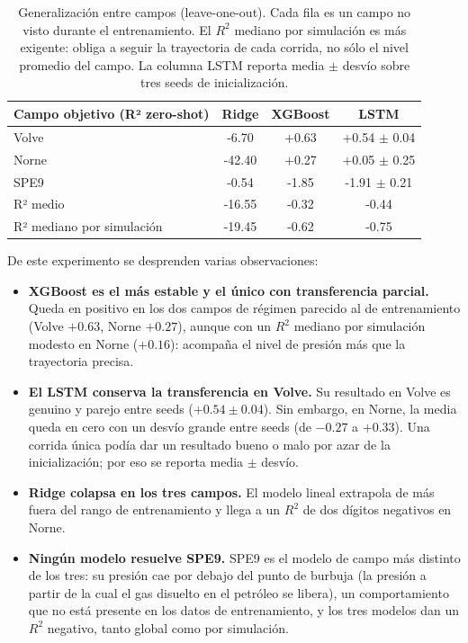 \documentclass[12pt,a4paper]{article}
\begin{document}
\begin{table}[H]
\centering
\begin{tabular}{|l|c|c|c|}
\hline
\textbf{Campo objetivo (R² zero-shot)} & \textbf{Ridge} & \textbf{XGBoost} & \textbf{LSTM} \\
\hline
Volve & -6.70 & +0.63 & +0.54 $\pm$ 0.04 \\
\hline
Norne & -42.40 & +0.27 & +0.05 $\pm$ 0.25 \\
\hline
SPE9  & -0.54 & -1.85 & -1.91 $\pm$ 0.21 \\
\hline
R² medio & -16.55 & -0.32 & -0.44 \\
\hline
R² mediano por simulación & -19.45 & -0.62 & -0.75 \\
\hline
\end{tabular}
\caption{Generalización entre campos (leave-one-out). Cada fila es un campo no visto
durante el entrenamiento. El $R^2$ mediano por simulación es más exigente: obliga a seguir la
trayectoria de cada corrida, no sólo el nivel promedio del campo. La columna LSTM reporta
media $\pm$ desvío sobre tres seeds de inicialización.}
\label{tab:lofo}
\end{table}

De este experimento se desprenden varias observaciones:

\begin{itemize}
  \item \textbf{XGBoost es el más estable y el único con transferencia parcial.} Queda en
  positivo en los dos campos de régimen parecido al de entrenamiento (Volve $+0.63$, Norne
  $+0.27$), aunque con un $R^2$ mediano por simulación modesto en Norne ($+0.16$): acompaña
  el nivel de presión más que la trayectoria precisa.

  \item \textbf{El LSTM conserva la transferencia en Volve.} Su resultado en Volve es
  genuino y parejo entre seeds ($+0.54 \pm 0.04$). Sin embargo, en Norne, la media queda en
  cero con un desvío grande entre seeds (de $-0.27$ a $+0.33$). Una corrida única podía
  dar un resultado bueno o malo por azar de la inicialización; por eso se reporta media
  $\pm$ desvío.

  \item \textbf{Ridge colapsa en los tres campos.} El modelo lineal extrapola de más
  fuera del rango de entrenamiento y llega a un $R^2$ de dos dígitos negativos en Norne.

  \item \textbf{Ningún modelo resuelve SPE9.} SPE9 es el modelo de campo más distinto de los tres: su
  presión cae por debajo del punto de burbuja (la presión a partir de la cual el gas disuelto
  en el petróleo se libera), un comportamiento que no está presente en los datos de entrenamiento, y
  los tres modelos dan un $R^2$ negativo, tanto global como por simulación.
\end{itemize}
\end{document}
